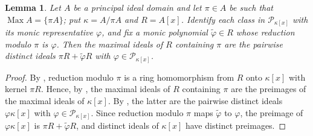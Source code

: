 \documentclass[12pt,reqno,a4paper]{amsart}
\newcommand{\Pe}{\mathcal{P}}
\DeclareMathOperator{\Max}{Max}
\theoremstyle{plain}
\newtheorem{lemma}[theorem]{Lemma}
\theoremstyle{definition}
\begin{document}
\begin{lemma}\label{lem:max-pi}
Let $A$ be a principal ideal domain and let $\pi\in A$ be such that $\Max A=\{\pi A\}$; put $\kappa=A/\pi A$ and $R=A[x]$. Identify each class in $\Pe_{\kappa[x]}$ with its monic representative $\varphi$, and fix a monic polynomial $\tilde\varphi\in R$ whose reduction modulo $\pi$ is $\varphi$. Then the maximal ideals of $R$ containing $\pi$ are the pairwise distinct ideals $\pi R+\tilde\varphi R$ with $\varphi\in\Pe_{\kappa[x]}$.
\end{lemma}
\begin{proof}
By \cite[Section~9.1, Proposition~2]{DummitFoote}, reduction modulo $\pi$ is a ring homomorphism from $R$ onto $\kappa[x]$ with kernel $\pi R$. Hence, by \cite[Proposition~1.1]{AtiyahMacdonald}, the maximal ideals of $R$ containing $\pi$ are the preimages of the maximal ideals of $\kappa[x]$. By \cite[Section~9.5, Proposition~15]{DummitFoote}, the latter are the pairwise distinct ideals $\varphi\kappa[x]$ with $\varphi\in\Pe_{\kappa[x]}$. Since reduction modulo $\pi$ maps $\tilde\varphi$ to $\varphi$, the preimage of $\varphi\kappa[x]$ is $\pi R+\tilde\varphi R$, and distinct ideals of $\kappa[x]$ have distinct preimages.
\end{proof}
\end{document}

